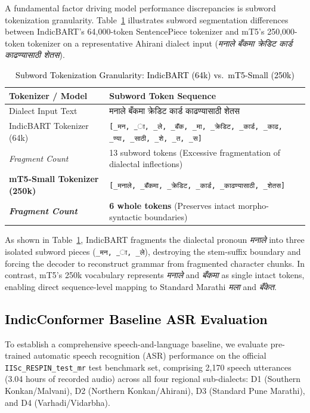 A fundamental factor driving model performance discrepancies is subword tokenization granularity. Table~\ref{tab:subword_tokenization} illustrates subword segmentation differences between IndicBART's 64,000-token SentencePiece tokenizer and mT5's 250,000-token tokenizer on a representative Ahirani dialect input (\emph{मनाले बँकमा क्रेडिट कार्ड काढण्यासाठी शेतस}).

\begin{table}[t]
\color{black}
\centering
\caption{\textcolor{black}{Subword Tokenization Granularity: IndicBART (64k) vs.\ mT5-Small (250k)}}
\label{tab:subword_tokenization}
\begin{tabularx}{\textwidth}{lX}
\hline
\textbf{Tokenizer / Model} & \textbf{Subword Token Sequence} \\
\hline
Dialect Input Text & मनाले बँकमा क्रेडिट कार्ड काढण्यासाठी शेतस \\
\hline
IndicBART Tokenizer (64k) & \texttt{[\_मन, \_ा, \_ले, \_बँक, \_मा, \_क्रेडिट, \_कार्ड, \_काढ, \_ण्या, \_साठी, \_शे, \_त, \_स]} \\
\textit{Fragment Count} & 13 subword tokens (Excessive fragmentation of dialectal inflections) \\
\hline
\textbf{mT5-Small Tokenizer (250k)} & \texttt{[\_मनाले, \_बँकमा, \_क्रेडिट, \_कार्ड, \_काढण्यासाठी, \_शेतस]} \\
\textbf{\textit{Fragment Count}} & \textbf{6 whole tokens} (Preserves intact morpho-syntactic boundaries) \\
\hline
\end{tabularx}
\end{table}

As shown in Table~\ref{tab:subword_tokenization}, IndicBART fragments the dialectal pronoun \emph{मनाले} into three isolated subword pieces (\texttt{\_मन, \_ा, \_ले}), destroying the stem-suffix boundary and forcing the decoder to reconstruct grammar from fragmented character chunks. In contrast, mT5's 250k vocabulary represents \emph{मनाले} and \emph{बँकमा} as single intact tokens, enabling direct sequence-level mapping to Standard Marathi \emph{मला} and \emph{बँकेत}.

\subsection{\textcolor{black}{IndicConformer Baseline ASR Evaluation}}

To establish a comprehensive speech-and-language baseline, we evaluate pre-trained automatic speech recognition (ASR) performance on the official \texttt{IISc\_RESPIN\_test\_mr} test benchmark set, comprising 2,170 speech utterances (3.04 hours of recorded audio) across all four regional sub-dialects: D1 (Southern Konkan/Malvani), D2 (Northern Konkan/Ahirani), D3 (Standard Pune Marathi), and D4 (Varhadi/Vidarbha).

